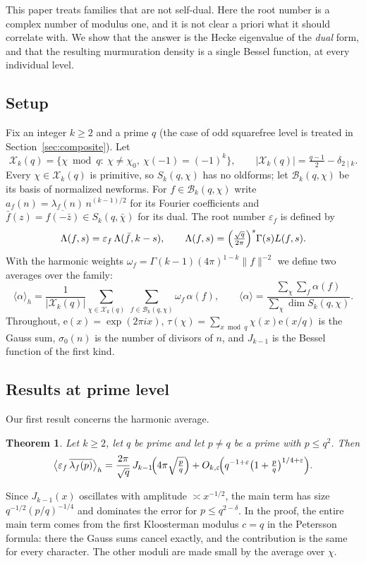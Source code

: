 \documentclass[11pt]{amsart}
\newtheorem{theorem}{Theorem}
\theoremstyle{remark}
\newcommand{\eps}{\varepsilon}
\newcommand{\e}{\mathrm{e}}
\newcommand{\cX}{\mathcal{X}}
\newcommand{\cB}{\mathcal{B}}
\newcommand{\ov}{\overline}
\begin{document}
This paper treats families that are not self-dual. Here the root number is a complex number of modulus one, and it is not clear a priori what it should correlate with. We show that the answer is the Hecke eigenvalue of the \emph{dual} form, and that the resulting murmuration density is a single Bessel function, at every individual level.

\subsection{Setup}
Fix an integer $k\ge2$ and a prime $q$ (the case of odd squarefree level is treated in Section~\ref{sec:composite}). Let
\[
\cX_k(q)=\{\chi \bmod q:\ \chi\ne\chi_0,\ \chi(-1)=(-1)^k\},\qquad |\cX_k(q)|=\tfrac{q-1}{2}-\delta_{2\mid k}.
\]
Every $\chi\in\cX_k(q)$ is primitive, so $S_k(q,\chi)$ has no oldforms; let $\cB_k(q,\chi)$ be its basis of normalized newforms. For $f\in\cB_k(q,\chi)$ write $a_f(n)=\lambda_f(n)\,n^{(k-1)/2}$ for its Fourier coefficients and $\bar f(z)=\ov{f(-\bar z)}\in S_k(q,\bar\chi)$ for its dual. The root number $\eps_f$ is defined by
\[
\Lambda(f,s)=\eps_f\,\Lambda(\bar f,k-s),\qquad \Lambda(f,s)=\Bigl(\tfrac{\sqrt q}{2\pi}\Bigr)^s\Gamma(s)L(f,s).
\]
With the harmonic weights $\omega_f=\Gamma(k-1)(4\pi)^{1-k}\|f\|^{-2}$ we define two averages over the family:
\[
\langle \alpha\rangle_h=\frac{1}{|\cX_k(q)|}\sum_{\chi\in\cX_k(q)}\ \sum_{f\in\cB_k(q,\chi)}\omega_f\,\alpha(f),\qquad
\langle \alpha\rangle=\frac{\sum_{\chi}\sum_{f}\alpha(f)}{\sum_\chi \dim S_k(q,\chi)}.
\]
Throughout, $\e(x)=\exp(2\pi ix)$, $\tau(\chi)=\sum_{x\bmod q}\chi(x)\e(x/q)$ is the Gauss sum, $\sigma_0(n)$ is the number of divisors of $n$, and $J_{k-1}$ is the Bessel function of the first kind.

\subsection{Results at prime level}
Our first result concerns the harmonic average.

\begin{theorem}\label{thm:main}
Let $k\ge2$, let $q$ be prime and let $p\neq q$ be a prime with $p\le q^2$. Then
\[
\bigl\langle \eps_f\,\ov{\lambda_f(p)}\bigr\rangle_h=\frac{2\pi}{\sqrt q}\,J_{k-1}\!\Bigl(4\pi\sqrt{\tfrac pq}\Bigr)+O_{k,\varepsilon}\!\Bigl(q^{-1+\varepsilon}\bigl(1+\tfrac pq\bigr)^{1/4+\varepsilon}\Bigr).
\]
\end{theorem}

Since $J_{k-1}(x)$ oscillates with amplitude $\asymp x^{-1/2}$, the main term has size $q^{-1/2}(p/q)^{-1/4}$ and dominates the error for $p\le q^{2-\delta}$. In the proof, the entire main term comes from the first Kloosterman modulus $c=q$ in the Petersson formula: there the Gauss sums cancel exactly, and the contribution is the same for every character. The other moduli are made small by the average over $\chi$.
\end{document}
